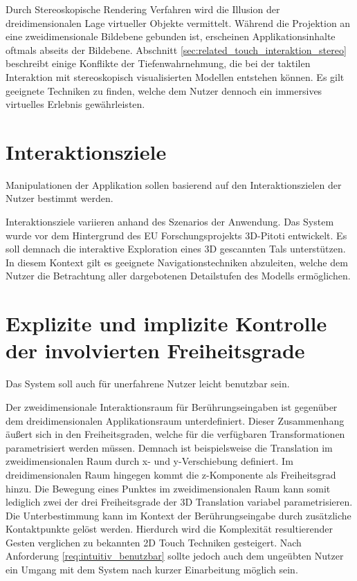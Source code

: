Durch Stereoskopische Rendering Verfahren wird die Illusion der dreidimensionalen Lage virtueller Objekte vermittelt. Während die Projektion an eine zweidimensionale Bildebene gebunden ist, erscheinen Applikationsinhalte oftmals abseits der Bildebene. Abschnitt \ref{sec:related_touch_interaktion_stereo} beschreibt einige Konflikte der Tiefenwahrnehmung, die bei der taktilen Interaktion mit stereoskopisch visualisierten Modellen entstehen können. Es gilt geeignete Techniken zu finden, welche dem Nutzer dennoch ein immersives virtuelles Erlebnis gewährleisten.


\section{Interaktionsziele}
\label{sec:interaktionsziele}

	\begin{anforderung}
	\label{req:interaktionsziele}
		Manipulationen der Applikation sollen basierend auf den Interaktionszielen der Nutzer bestimmt werden.
	\end{anforderung}

Interaktionsziele variieren anhand des Szenarios der Anwendung. Das System wurde vor dem Hintergrund des EU Forschungsprojekts 3D-Pitoti entwickelt. Es soll demnach die interaktive Exploration eines 3D gescannten Tals unterstützen. In diesem Kontext gilt es geeignete Navigationstechniken abzuleiten, welche dem Nutzer die Betrachtung aller dargebotenen Detailstufen des Modells ermöglichen.


\section{Explizite und implizite Kontrolle der involvierten Freiheitsgrade}
\label{sec:kontrolle_der_freiheitsgrade}

	\begin{anforderung}
	\label{req:intuitiv_benutzbar}
		Das System soll auch für unerfahrene Nutzer leicht benutzbar sein.
	\end{anforderung}

Der zweidimensionale Interaktionsraum für Berührungseingaben ist gegenüber dem dreidimensionalen Applikationsraum unterdefiniert. Dieser Zusammenhang äußert sich in den Freiheitsgraden, welche für die verfügbaren Transformationen parametrisiert werden müssen. Demnach ist beispielsweise die Translation im zweidimensionalen Raum durch x- und y-Verschiebung definiert. Im dreidimensionalen Raum hingegen kommt die z-Komponente als Freiheitsgrad hinzu. Die Bewegung eines Punktes im zweidimensionalen Raum kann somit lediglich zwei der drei Freiheitsgrade der 3D Translation variabel parametrisieren. Die Unterbestimmung kann im Kontext der Berührungseingabe durch zusätzliche Kontaktpunkte gelöst werden. Hierdurch wird die Komplexität resultierender Gesten verglichen zu bekannten 2D Touch Techniken gesteigert. Nach Anforderung \ref{req:intuitiv_benutzbar} sollte jedoch auch dem ungeübten Nutzer ein Umgang mit dem System nach kurzer Einarbeitung möglich sein.

